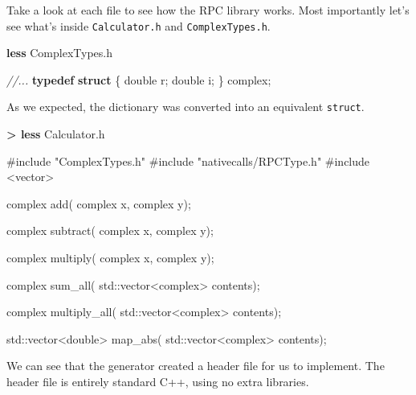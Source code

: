 \documentclass[]{article}
\newenvironment{Shaded}{}{}
\newcommand{\KeywordTok}[1]{\textcolor[rgb]{0.00,0.44,0.13}{\textbf{{#1}}}}
\newcommand{\DataTypeTok}[1]{\textcolor[rgb]{0.56,0.13,0.00}{{#1}}}
\newcommand{\CommentTok}[1]{\textcolor[rgb]{0.38,0.63,0.69}{\textit{{#1}}}}
\newcommand{\OtherTok}[1]{\textcolor[rgb]{0.00,0.44,0.13}{{#1}}}
\newcommand{\NormalTok}[1]{{#1}}
\begin{document}
Take a look at each file to see how the RPC library works. Most
importantly let's see what's inside \texttt{Calculator.h} and
\texttt{ComplexTypes.h}.

\begin{Shaded}
\begin{Highlighting}[]
\KeywordTok{less} \NormalTok{ComplexTypes.h}
\end{Highlighting}
\end{Shaded}

\begin{Shaded}
\begin{Highlighting}[]
\CommentTok{//...}
\KeywordTok{typedef} \KeywordTok{struct} \NormalTok{\{}
  \DataTypeTok{double} \NormalTok{r;}
  \DataTypeTok{double} \NormalTok{i;}
\NormalTok{\} complex;}
\end{Highlighting}
\end{Shaded}

As we expected, the dictionary was converted into an equivalent
\texttt{struct}.

\begin{Shaded}
\begin{Highlighting}[]
\KeywordTok{> less} \NormalTok{Calculator.h}
\end{Highlighting}
\end{Shaded}

\begin{Shaded}
\begin{Highlighting}[]
\OtherTok{#include "ComplexTypes.h"}
\OtherTok{#include "nativecalls/RPCType.h"}
\OtherTok{#include <vector>}

\NormalTok{complex add( complex x,  complex y);}

\NormalTok{complex subtract( complex x,  complex y);}

\NormalTok{complex multiply( complex x,  complex y);}

\NormalTok{complex sum_all( std::vector<complex> contents);}

\NormalTok{complex multiply_all( std::vector<complex> contents);}

\NormalTok{std::vector<}\DataTypeTok{double}\NormalTok{> map_abs( std::vector<complex> contents);}
\end{Highlighting}
\end{Shaded}

We can see that the generator created a header file for us to implement.
The header file is entirely standard C++, using no extra libraries.

\end{document}

